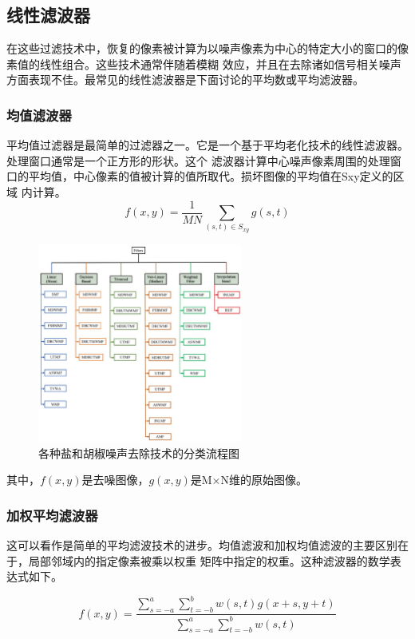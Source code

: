 \documentclass[12pt]{article} %
\begin{document}
\subsection{线性滤波器}
在这些过滤技术中，恢复的像素被计算为以噪声像素为中心的特定大小的窗口的像素值的线性组合。这些技术通常伴随着模糊
效应，并且在去除诸如信号相关噪声方面表现不佳。最常见的线性滤波器是下面讨论的平均数或平均滤波器。

\subsubsection{均值滤波器}
平均值过滤器是最简单的过滤器之一。它是一个基于平均老化技术的线性滤波器。处理窗口通常是一个正方形的形状。这个
滤波器计算中心噪声像素周围的处理窗口的平均值，中心像素的值被计算的值所取代。损坏图像的平均值在Sxy定义的区域
内计算\cite{ref1,ref5,ref6,ref24}。
\begin{equation}
    f(x,y)=\frac{1}{MN}\sum_{(s,t)\in S_{xy}}g(s,t)
\end{equation}
\begin{figure}[H]
    \centering
    \includegraphics[width=0.6\textwidth]{images/01.eps}
    \caption{各种盐和胡椒噪声去除技术的分类流程图}
    \label{fig:meanfilter}
\end{figure}
其中，$f(x,y)$是去噪图像，$g(x,y)$是M×N维的原始图像。

\subsubsection{加权平均滤波器}
这可以看作是简单的平均滤波技术的进步。均值滤波和加权均值滤波的主要区别在于，局部邻域内的指定像素被乘以权重
矩阵中指定的权重\cite{ref29,ref32}。这种滤波器的数学表达式如下。

\begin{equation}
    f(x, y)=\frac{\sum_{s=-a}^a \sum_{t=-b}^b w(s, t) g(x+s, y+t)}{\sum_{s=-a}^a \sum_{t=-b}^b w(s, t)}
\end{equation}
\end{document}
